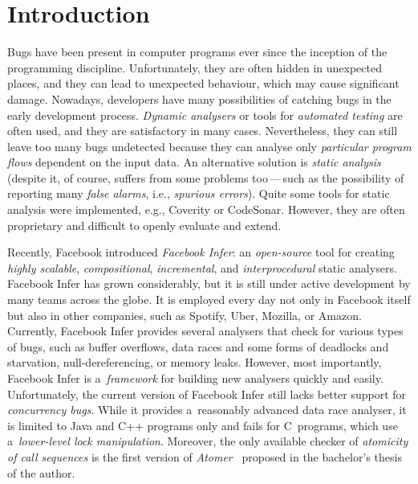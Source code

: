 




\chapter{Introduction}

Bugs have been present in computer programs ever since the inception of the programming discipline. Unfortunately, they are often hidden in unexpected places, and they can lead to unexpected behaviour, which may cause significant damage. Nowadays, developers have many possibilities of catching bugs in the early development process. \emph{Dynamic analysers} or tools for \emph{automated testing} are often used, and they are satisfactory in many cases. Nevertheless, they can still leave too many bugs undetected because they can analyse only \emph{particular program flows} dependent on the input data. An alternative solution is \emph{static analysis} (despite it, of course, suffers from some problems too\,---\,such as the possibility of reporting many \emph{false alarms}, i.e., \emph{spurious errors}). Quite some tools for static analysis were implemented, e.g., Coverity or CodeSonar. However, they are often proprietary and difficult to openly evaluate and extend.

Recently, Facebook introduced \emph{Facebook Infer}: an \emph{open-source} tool for creating \emph{highly scalable}, \emph{compositional}, \emph{incremental}, and \emph{interprocedural} static analysers. Facebook Infer has grown considerably, but it is still under active development by many teams across the globe. It is employed every day not only in Facebook itself but also in other companies, such as Spotify, Uber, Mozilla, or Amazon. Currently, Facebook Infer provides several analysers that check for various types of bugs, such as buffer overflows, data races and some forms of deadlocks and starvation, null-dereferencing, or memory leaks. However, most importantly, Facebook Infer is a~\emph{framework} for building new analysers quickly and easily. Unfortunately, the current version of Facebook Infer still lacks better support for \emph{concurrency bugs}. While it provides a~reasonably advanced data race analyser, it is limited to Java and C++ programs only and fails for C~programs, which use a~\emph{lower-level lock manipulation}. Moreover, the only available checker of \emph{atomicity of call sequences} is the first version of \emph{Atomer}~\cite{harmimBP} proposed in the bachelor's thesis of the author.

